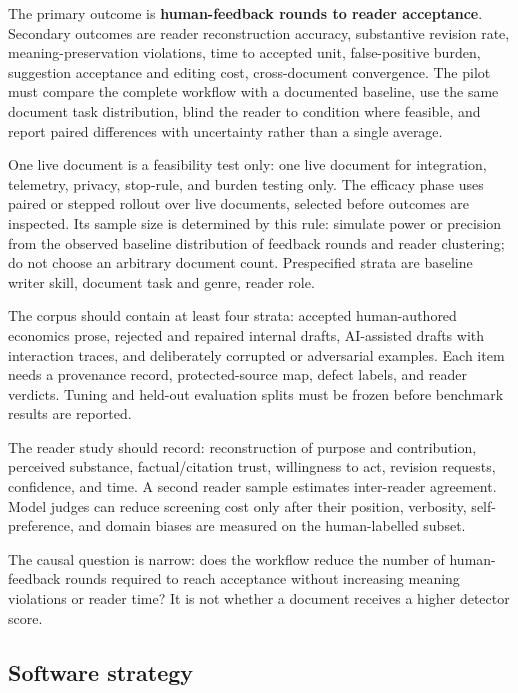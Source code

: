 \documentclass[11pt]{article}
\begin{document}
The primary outcome is \textbf{human-feedback rounds to reader acceptance}. Secondary outcomes are reader reconstruction accuracy, substantive revision rate, meaning-preservation violations, time to accepted unit, false-positive burden, suggestion acceptance and editing cost, cross-document convergence. The pilot must compare the complete workflow with a documented baseline, use the same document task distribution, blind the reader to condition where feasible, and report paired differences with uncertainty rather than a single average.

One live document is a feasibility test only: one live document for integration, telemetry, privacy, stop-rule, and burden testing only. The efficacy phase uses paired or stepped rollout over live documents, selected before outcomes are inspected. Its sample size is determined by this rule: simulate power or precision from the observed baseline distribution of feedback rounds and reader clustering; do not choose an arbitrary document count. Prespecified strata are baseline writer skill, document task and genre, reader role.

The corpus should contain at least four strata: accepted human-authored economics prose, rejected and repaired internal drafts, AI-assisted drafts with interaction traces, and deliberately corrupted or adversarial examples. Each item needs a provenance record, protected-source map, defect labels, and reader verdicts. Tuning and held-out evaluation splits must be frozen before benchmark results are reported.

The reader study should record: reconstruction of purpose and contribution, perceived substance, factual/citation trust, willingness to act, revision requests, confidence, and time. A second reader sample estimates inter-reader agreement. Model judges can reduce screening cost only after their position, verbosity, self-preference, and domain biases are measured on the human-labelled subset.

The causal question is narrow: does the workflow reduce the number of human-feedback rounds required to reach acceptance without increasing meaning violations or reader time? It is not whether a document receives a higher detector score.

\hypertarget{software-strategy}{%
\subsection{Software strategy}\label{software-strategy}}
\end{document}
